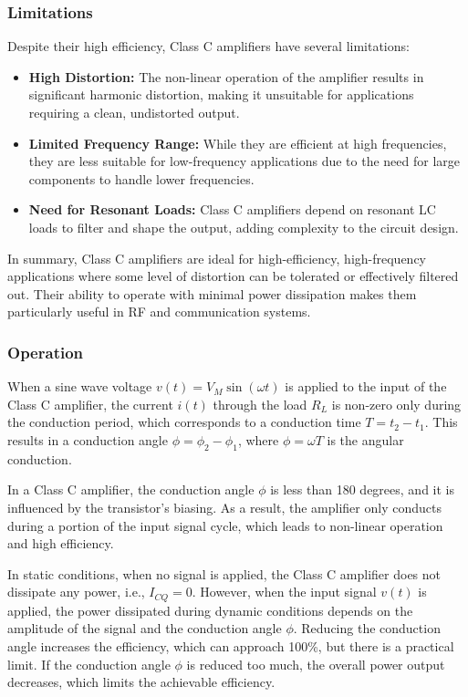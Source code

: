 \documentclass[12pt,a4paper]{article}
\begin{document}
    \subsubsection{Limitations}
    Despite their high efficiency, Class C amplifiers have several limitations:
    \begin{itemize}
        \item \textbf{High Distortion:} The non-linear operation of the amplifier results in significant harmonic distortion, making it unsuitable for applications requiring a clean, undistorted output.
        \item \textbf{Limited Frequency Range:} While they are efficient at high frequencies, they are less suitable for low-frequency applications due to the need for large components to handle lower frequencies.
        \item \textbf{Need for Resonant Loads:} Class C amplifiers depend on resonant LC loads to filter and shape the output, adding complexity to the circuit design.
    \end{itemize}

    In summary, Class C amplifiers are ideal for high-efficiency, high-frequency applications where some level of distortion can be tolerated or effectively filtered out. Their ability to operate with minimal power dissipation makes them particularly useful in RF and communication systems.


    \subsubsection{Operation}

    When a sine wave voltage \( v(t) = V_M \sin(\omega t) \) is applied to the input of the Class C amplifier, the current \( i(t) \) through the load \( R_L \) is non-zero only during the conduction period, which corresponds to a conduction time \( T = t_2 - t_1 \). This results in a conduction angle \( \phi = \phi_2 - \phi_1 \), where \( \phi = \omega T \) is the angular conduction.

    In a Class C amplifier, the conduction angle \( \phi \) is less than 180 degrees, and it is influenced by the transistor’s biasing. As a result, the amplifier only conducts during a portion of the input signal cycle, which leads to non-linear operation and high efficiency.

    In static conditions, when no signal is applied, the Class C amplifier does not dissipate any power, i.e., \( I_{CQ} = 0 \). However, when the input signal \( v(t) \) is applied, the power dissipated during dynamic conditions depends on the amplitude of the signal and the conduction angle \( \phi \). Reducing the conduction angle increases the efficiency, which can approach 100\%, but there is a practical limit. If the conduction angle \( \phi \) is reduced too much, the overall power output decreases, which limits the achievable efficiency.
\end{document}
